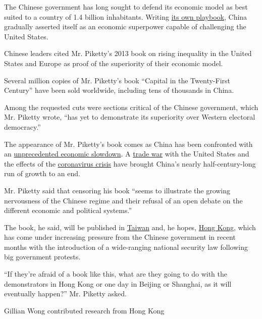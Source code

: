 The Chinese government has long sought to defend its economic model as
best suited to a country of 1.4 billion inhabitants. Writing
\href{https://www.nytimes3xbfgragh.onion/interactive/2018/11/18/world/asia/china-rules.html}{its
own playbook}, China gradually asserted itself as an economic superpower
capable of challenging the United States.

Chinese leaders cited Mr. Piketty's 2013 book on rising inequality in
the United States and Europe as proof of the superiority of their
economic model.

Several million copies of Mr. Piketty's book ``Capital in the
Twenty-First Century'' have been sold worldwide, including tens of
thousands in China.

Among the requested cuts were sections critical of the Chinese
government, which Mr. Piketty wrote, ``has yet to demonstrate its
superiority over Western electoral democracy.''

The appearance of Mr. Piketty's book comes as China has been confronted
with an
\href{https://www.nytimes3xbfgragh.onion/2019/10/17/business/china-economic-growth.html}{unprecedented
economic slowdown}. A
\href{https://www.nytimes3xbfgragh.onion/2019/08/06/world/asia/china-xi-jingping-trade.html}{trade
war} with the United States and the effects of the
\href{https://www.nytimes3xbfgragh.onion/2020/04/16/business/china-coronavirus-economy.html}{coronavirus
crisis} have brought China's nearly half-century-long run of growth to
an end.

Mr. Piketty said that censoring his book ``seems to illustrate the
growing nervousness of the Chinese regime and their refusal of an open
debate on the different economic and political systems.''

The book, he said, will be published in
\href{https://www.nytimes3xbfgragh.onion/2020/08/30/world/asia/taiwan-china-military.html}{Taiwan}
and, he hopes,
\href{https://www.nytimes3xbfgragh.onion/2020/07/31/world/asia/hong-kong-election-national-security-law.html}{Hong
Kong}, which has come under increasing pressure from the Chinese
government in recent months with the introduction of a wide-ranging
national security law following big government protests.

``If they're afraid of a book like this, what are they going to do with
the demonstrators in Hong Kong or one day in Beijing or Shanghai, as it
will eventually happen?'' Mr. Piketty asked.

Gillian Wong contributed research from Hong Kong

